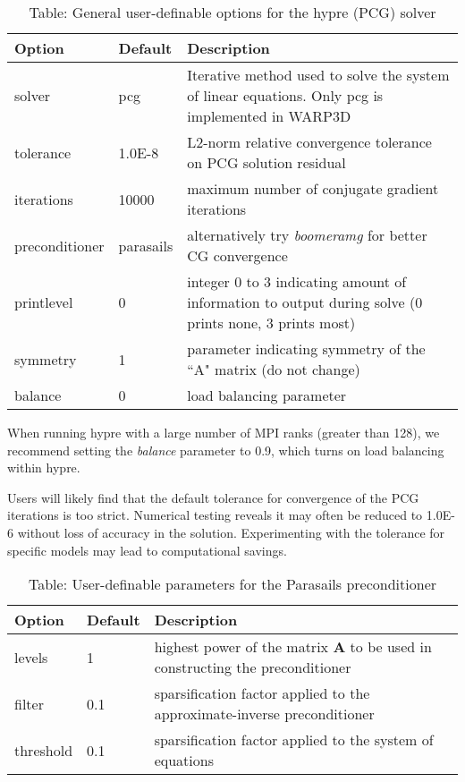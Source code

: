 \documentclass[11pt]{report}
\numberwithin{equation}{section}
\newcommand{\ti}{\emph}
\begin{document}
%
\begin{table}[htb]
\setlength{\extrarowheight}{5.0pt}
\small
\begin{tabular}[htb] { | p{1in} | p{0.5in} | p{4.0in} |  }
\hline 
Option & Default & Description \\
\hline \hline 
solver & pcg & Iterative method used to solve the system of linear equations.  Only pcg is implemented in WARP3D \\
tolerance & 1.0E-8  & L2-norm relative convergence tolerance on PCG solution residual \\
iterations & 10000 & maximum number of conjugate gradient iterations \\
preconditioner & parasails & alternatively try \ti{boomeramg} for better CG convergence  \\
printlevel & 0 & integer 0 to 3 indicating amount of information to output during solve (0 prints none, 3 prints most) \\
symmetry & 1 & parameter indicating symmetry of the ``A" matrix (do not change)  \\
balance & 0 & load balancing parameter \\ \hline
\end{tabular}
\caption{Table: General user-definable options for the hypre (PCG) solver}	
\normalsize
\end{table}


When running hypre with a large number of MPI ranks 
(greater than 128), we recommend setting the \ti{balance} parameter to 0.9, which turns on load 
balancing within hypre.  

Users will likely find that the default tolerance for convergence of the 
PCG iterations is too strict.  Numerical testing reveals it may often
be reduced to 1.0E-6 without loss of accuracy in the solution. Experimenting with the
tolerance for specific models may lead to computational savings.

%
\begin{table}[htb]
\setlength{\extrarowheight}{5.0pt}
\small
\begin{tabular}[htb] { | p{1in} | p{0.5in} | p{4.0in} |  }
\hline 
Option & Default & Description \\
\hline \hline 
levels & 1 & highest power of the matrix $\mathbf{A}$ to be used in constructing the preconditioner  \\
filter & 0.1 & sparsification factor applied to the approximate-inverse preconditioner \\
threshold & 0.1 & sparsification factor applied to the system of equations \\ \hline
\end{tabular}
\caption{Table: User-definable parameters for the Parasails preconditioner}	
\normalsize
\end{table}
\end{document}
